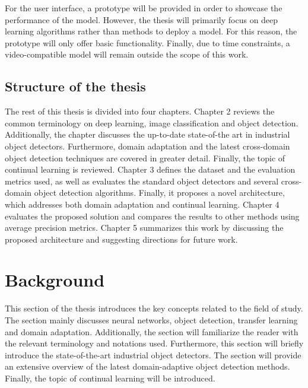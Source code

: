 \documentclass[english, 12pt, a4paper, elec, utf8, a-1b, online]{aaltothesis}
\begin{document}
For the user interface, a prototype will be provided in order to showcase the performance of the model. However, the thesis will primarily focus on deep learning algorithms rather than methods to deploy a model. For this reason, the prototype will only offer basic functionality. Finally, due to time constraints, a video-compatible model will remain outside the scope of this work. 



\subsection{Structure of the thesis}
The rest of this thesis is divided into four chapters. Chapter 2 reviews the common terminology on deep learning, image classification and object detection. Additionally, the chapter discusses the up-to-date state-of-the art in industrial object detectors. Furthermore, domain adaptation and the latest cross-domain object detection techniques are covered in greater detail. Finally, the topic of continual learning is reviewed. Chapter 3 defines the dataset and the evaluation metrics used, as well as evaluates the standard object detectors and several cross-domain object detection algorithms. Finally, it proposes a novel architecture, which addresses both domain adaptation and continual learning. Chapter 4 evaluates the proposed solution and compares the results to other methods using average precision metrics. Chapter 5 summarizes this work by discussing the proposed architecture and suggesting directions for future work.

\clearpage
\section{Background}
This section of the thesis introduces the key concepts related to the field of study. The section mainly discusses neural networks, object detection, transfer learning and domain adaptation. Additionally, the section will familiarize the reader with the relevant terminology and notations used. Furthermore, this section will briefly introduce the state-of-the-art industrial object detectors. The section will provide an extensive overview of the latest domain-adaptive object detection methods. Finally, the topic of  continual learning will be introduced. 
\end{document}

